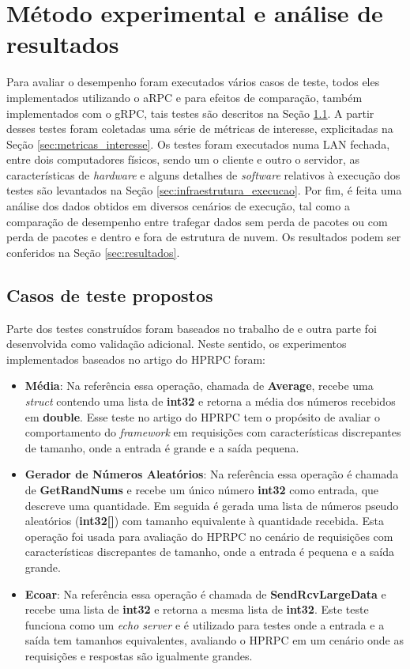 \chapter{Método experimental e análise de resultados}
\label{chp:capitulo4}

Para avaliar o desempenho foram executados vários casos de teste, todos eles implementados utilizando o aRPC e para efeitos de comparação, também implementados com o gRPC, tais testes são descritos na Seção \ref{sec:testes_propostos}. A partir desses testes foram coletadas uma série de métricas de interesse, explicitadas na Seção \ref{sec:metricas_interesse}. Os testes foram executados numa LAN fechada, entre dois computadores físicos, sendo um o cliente e outro o servidor, as características de \textit{hardware} e alguns detalhes de \textit{software} relativos à execução dos testes são levantados na Seção \ref{sec:infraestrutura_execucao}. Por fim, é feita uma análise dos dados obtidos em diversos cenários de execução, tal como a comparação de desempenho entre trafegar dados sem perda de pacotes ou com perda de pacotes e dentro e fora de estrutura de nuvem. Os resultados podem ser conferidos na Seção \ref{sec:resultados}.

\section{Casos de teste propostos}
\label{sec:testes_propostos}

Parte dos testes construídos foram baseados no trabalho de \cite{bagci_lightweight_2016} e outra parte foi desenvolvida como validação adicional. Neste sentido, os experimentos implementados baseados no artigo do HPRPC foram:

\begin{itemize}
	\item \textbf{Média}: Na referência essa operação, chamada de \textbf{Average}, recebe uma \textit{struct} contendo uma lista de \textbf{int32} e retorna a média dos números recebidos em \textbf{double}. Esse teste no artigo do HPRPC tem o propósito de avaliar o comportamento do \textit{framework} em requisições com características discrepantes de tamanho, onde a entrada é grande e a saída pequena.
	\item \textbf{Gerador de Números Aleatórios}: Na referência essa operação é chamada de \textbf{GetRandNums} e recebe um único número \textbf{int32} como entrada, que descreve uma quantidade. Em seguida é gerada uma lista de números pseudo aleatórios (\textbf{int32[]}) com tamanho equivalente à quantidade recebida. Esta operação foi usada para avaliação do HPRPC no cenário de requisições com características discrepantes de tamanho, onde a entrada é pequena e a saída grande.

	\item \textbf{Ecoar}: Na referência essa operação é chamada de \textbf{SendRcvLargeData} e recebe uma lista de \textbf{int32} e retorna a mesma lista de \textbf{int32}. Este teste funciona como um \textit{echo server} e é utilizado para testes onde a entrada e a saída tem tamanhos equivalentes, avaliando o HPRPC em um cenário onde as requisições e respostas são igualmente grandes.
\end{itemize}

